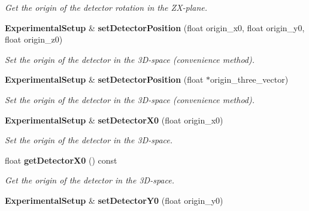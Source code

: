 \begin{DoxyCompactItemize}
\begin{DoxyCompactList}\small\item\em Get the origin of the detector rotation in the ZX-\/plane. \item\end{DoxyCompactList}\item 
{\bf ExperimentalSetup} \& {\bf setDetectorPosition} (float origin\_\-x0, float origin\_\-y0, float origin\_\-z0)\label{classCALICE_1_1ExperimentalSetup_aaf75664b180814002f19098ec51b3d1d}

\begin{DoxyCompactList}\small\item\em Set the origin of the detector in the 3D-\/space (convenience method). \item\end{DoxyCompactList}\item 
{\bf ExperimentalSetup} \& {\bf setDetectorPosition} (float $\ast$origin\_\-three\_\-vector)\label{classCALICE_1_1ExperimentalSetup_aab3af41304b7791a7c2a89f8176f2727}

\begin{DoxyCompactList}\small\item\em Set the origin of the detector in the 3D-\/space (convenience method). \item\end{DoxyCompactList}\item 
{\bf ExperimentalSetup} \& {\bf setDetectorX0} (float origin\_\-x0)\label{classCALICE_1_1ExperimentalSetup_aaa5c739bf5550616dc9daf06e66fa7d3}

\begin{DoxyCompactList}\small\item\em Set the origin of the detector in the 3D-\/space. \item\end{DoxyCompactList}\item 
float {\bf getDetectorX0} () const \label{classCALICE_1_1ExperimentalSetup_a7f4e4616fa5a304aea5ad88e79522871}

\begin{DoxyCompactList}\small\item\em Get the origin of the detector in the 3D-\/space. \item\end{DoxyCompactList}\item 
{\bf ExperimentalSetup} \& {\bf setDetectorY0} (float origin\_\-y0)\label{classCALICE_1_1ExperimentalSetup_aa8f94b2b4eaac33011c13df005e4141d}


\end{DoxyCompactItemize}
